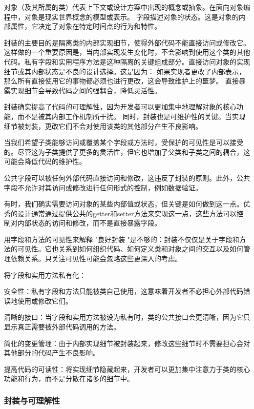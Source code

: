 \documentclass[]{ctexbook}
\begin{document}
对象（及其所属的类）代表上下文或设计方案中出现的概念或抽象。在面向对象编程中，对象是现实世界概念的模型或表示。
字段描述对象的状态。这是对象的内部属性，它决定了对象在特定时间点的行为和特性。

封装的主要目的是隔离类的内部实现细节，使得外部代码不能直接访问或修改它。这样做的一个重要原因是，当内部实现发生变化时，不会影响到使用这个类的其他代码。私有字段和实用程序方法是这种隔离的关键组成部分。直接访问对象的实现细节或其内部状态是不良的设计选择。这是因为：
如果实现者更改了内部表示，那么所有直接使用它的事物都必须也进行更改，这会导致维护上的噩梦。
直接暴露实现细节会导致代码之间的强耦合，降低灵活性。

封装确实提高了代码的可理解性，因为开发者可以更加集中地理解对象的核心功能，而不是被其内部工作机制所干扰。
同时，封装也是可维护性的关键。当实现细节被封装，更改它们不会对使用该类的其他部分产生不良影响。

当我们希望子类能够访问或覆盖某个字段或方法时，受保护的可见性是可以接受的。尽管这为子类提供了更多的灵活性，但它也增加了父类和子类之间的耦合，这可能会降低代码的维护性。

公共字段可以被任何外部代码直接访问和修改，这违反了封装的原则。此外，公共字段不允许对其访问或修改进行任何形式的控制，例如数据验证。

有时，我们确实需要访问对象的某些内部值或状态，但关键是如何做到这一点。优秀的设计通常通过提供公共的getter和setter方法来实现这一点，这些方法可以控制对内部状态的访问和修改，而不是直接暴露字段。

用字段和方法的可见性来解释 "良好封装 "是不够的：封装不仅仅是关于字段和方法的可见性。它也关系到如何组织代码、如何定义类和对象之间的交互以及如何管理依赖关系。只关注可见性可能会忽略这些更深入的考虑。

将字段和实用方法私有化：

安全性：私有字段和方法只能被类自己使用，这意味着开发者不必担心外部代码错误地使用或修改它们。

清晰的接口：当字段和实用方法被设为私有时，类的公共接口会更清晰，因为它只显示真正需要被外部代码调用的方法。

简化的变更管理：由于内部实现细节被封装起来，修改这些细节时不需要担心会对其他部分的代码产生不良影响。

提高代码的可读性：将实现细节隐藏起来，开发者可以更加集中注意力于类的核心功能和行为，而不是分散在诸多的细节中。

\subsubsection{封装与可理解性}
\end{document}
